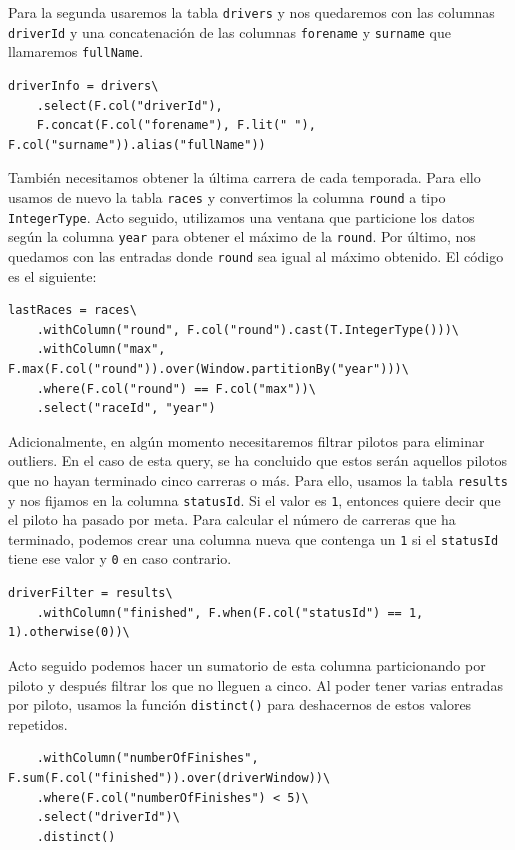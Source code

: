 \documentclass[12pt,twoside,titlepage]{report}
\begin{document}
Para la segunda usaremos la tabla \texttt{drivers} y nos quedaremos con las columnas \texttt{driverId} y una concatenación de las columnas \texttt{forename} y \texttt{surname} que llamaremos \texttt{fullName}.

\begin{lstlisting}
driverInfo = drivers\
	.select(F.col("driverId"),
	F.concat(F.col("forename"), F.lit(" "), F.col("surname")).alias("fullName"))
\end{lstlisting}

También necesitamos obtener la última carrera de cada temporada. Para ello usamos de nuevo la tabla \texttt{races} y convertimos la columna \texttt{round} a tipo \texttt{IntegerType}. Acto seguido, utilizamos una ventana que particione los datos según la columna \texttt{year} para obtener el máximo de la \texttt{round}. Por último, nos quedamos con las entradas donde \texttt{round} sea igual al máximo obtenido. El código es el siguiente:

\begin{lstlisting}
lastRaces = races\
	.withColumn("round", F.col("round").cast(T.IntegerType()))\
	.withColumn("max", F.max(F.col("round")).over(Window.partitionBy("year")))\
	.where(F.col("round") == F.col("max"))\
	.select("raceId", "year")
\end{lstlisting}


Adicionalmente, en algún momento necesitaremos filtrar pilotos para eliminar outliers. En el caso de esta query, se ha concluido que estos serán aquellos pilotos que no hayan terminado cinco carreras o más. Para ello, usamos la tabla \texttt{results} y nos fijamos en la columna \texttt{statusId}. Si el valor es \texttt{1}, entonces quiere decir que el piloto ha pasado por meta. Para calcular el número de carreras que ha terminado, podemos crear una columna nueva que contenga un \texttt{1} si el \texttt{statusId} tiene ese valor y \texttt{0} en caso contrario.

\begin{lstlisting}
driverFilter = results\
	.withColumn("finished", F.when(F.col("statusId") == 1, 1).otherwise(0))\
\end{lstlisting}

Acto seguido podemos hacer un sumatorio de esta columna particionando por piloto y después filtrar los que no lleguen a cinco. Al poder tener varias entradas por piloto, usamos la función \texttt{distinct()} para deshacernos de estos valores repetidos.

\begin{lstlisting}
	.withColumn("numberOfFinishes", F.sum(F.col("finished")).over(driverWindow))\
	.where(F.col("numberOfFinishes") < 5)\
	.select("driverId")\
	.distinct()
\end{lstlisting}
\end{document}
